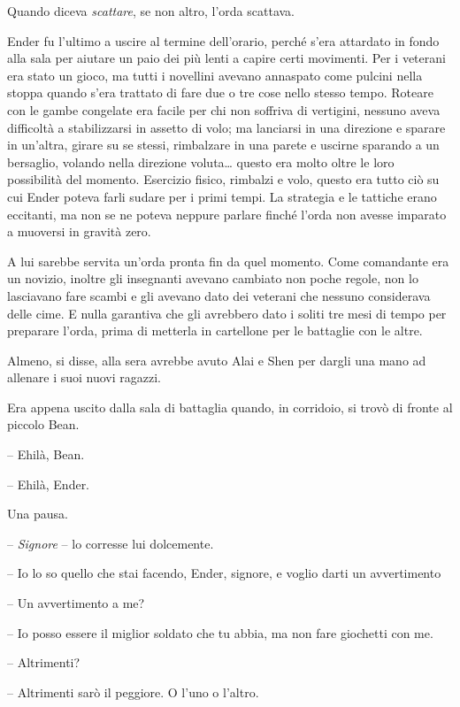 {Quando diceva \emph{scattare}, \emph{} se non altro, l'orda scattava.}

{Ender fu l'ultimo a uscire al termine dell'orario, perché s'era
	attardato in fondo alla sala per aiutare un paio dei più lenti a capire
	certi movimenti. Per i veterani era stato un gioco, ma tutti i novellini
	avevano annaspato come pulcini nella stoppa quando s'era trattato di
	fare due o tre cose nello stesso tempo. Roteare con le gambe congelate
	era facile per chi non soffriva di vertigini, nessuno aveva difficoltà a
	stabilizzarsi in assetto di volo; ma lanciarsi in una direzione e
	sparare in un'altra, girare su se stessi, rimbalzare in una parete e
	uscirne sparando a un bersaglio, volando nella direzione voluta\ldots{}
	questo era molto oltre le loro possibilità del momento. Esercizio
	fisico, rimbalzi e volo, questo era tutto ciò su cui Ender poteva farli
	sudare per i primi tempi. La strategia e le tattiche erano eccitanti, ma
	non se ne poteva neppure parlare finché l'orda non avesse imparato a
	muoversi in gravità zero.}

{A lui sarebbe servita un'orda pronta fin da quel momento. Come
	comandante era un novizio, inoltre gli insegnanti avevano cambiato non
	poche regole, non lo lasciavano fare scambi e gli avevano dato dei
	veterani che nessuno considerava delle cime. E nulla garantiva che gli
	avrebbero dato i soliti tre mesi di tempo per preparare l'orda, prima di
	metterla in cartellone per le battaglie con le altre.}

{Almeno, si disse, alla sera avrebbe avuto Alai e Shen per dargli una
	mano ad allenare i suoi nuovi ragazzi.}

{Era appena uscito dalla sala di battaglia quando, in corridoio, si
	trovò di fronte al piccolo Bean.}

\foreignlanguage{ngerman}{-- Ehilà, Bean.}

\foreignlanguage{ngerman}{-- Ehilà, Ender.}

\foreignlanguage{ngerman}{Una pausa.}

{-- \emph{Signore} -- lo corresse lui dolcemente.}

{-- Io lo so quello che stai facendo, Ender, signore, e voglio darti un
	avvertimento}

{-- Un avvertimento a me?}

{-- Io posso essere il miglior soldato che tu abbia, ma non fare
	giochetti con me.}

{-- Altrimenti?}

{-- Altrimenti sarò il peggiore. O l'uno o l'altro.}

